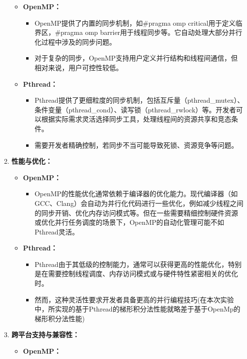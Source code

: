\documentclass{nku}
\begin{document}
\begin{enumerate}
\begin{itemize}
        \item \textbf{OpenMP：} 
        \begin{itemize}
            \item OpenMP提供了内置的同步机制，如\#pragma omp critical用于定义临界区，\#pragma omp barrier用于线程同步等。它自动处理大部分并行化过程中涉及的同步问题。
            \item 对于复杂的同步，OpenMP支持用户定义并行结构和线程间通信，但相对来说，用户可控性较低。
        \end{itemize}
        \item \textbf{Pthread：}
        \begin{itemize}
            \item Pthread提供了更细粒度的同步机制，包括互斥量（pthread\_mutex）、条件变量（pthread\_cond）、读写锁（pthread\_rwlock）等。开发者可以根据实际需求灵活选择同步工具，处理线程间的资源共享和竞态条件。
            \item 需要开发者精确控制，若同步不当可能导致死锁、资源竞争等问题。
        \end{itemize}
    \end{itemize}
    \item \textbf{性能与优化：}
    \begin{itemize}
        \item \textbf{OpenMP：}  
        \begin{itemize}
            \item OpenMP的性能优化通常依赖于编译器的优化能力。现代编译器（如GCC、Clang）会自动为并行化代码进行一些优化，例如减少线程之间的同步开销、优化内存访问模式等。但在一些需要精细控制硬件资源或优化并行任务调度的场景下，OpenMP的自动化管理可能不如Pthread灵活。
        \end{itemize}
        \item \textbf{Pthread：}
        \begin{itemize}
            \item Pthread由于其低级的控制能力，通常可以获得更高的性能优化，特别是在需要控制线程调度、内存访问模式或与硬件特性紧密相关的优化时。
            \item 然而，这种灵活性要求开发者具备更高的并行编程技巧(在本次实验中，所实现的基于Pthread的梯形积分法性能就略差于基于OpenMp的梯形积分法性能)
        \end{itemize}
    \end{itemize}
    \item \textbf{跨平台支持与兼容性：}
    \begin{itemize}
        \item \textbf{OpenMP：} 

\end{itemize}
\end{enumerate}
\end{document}
